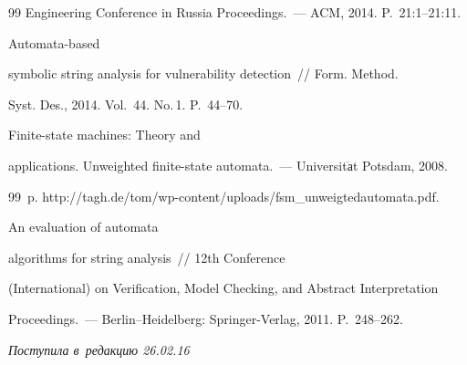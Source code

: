 {{\begin{thebibliography}{99}
Engineering Conference in Russia Proceedings.~--- ACM, 2014. P.~21:1--21:11.







 Automata-based 


symbolic string analysis for vulnerability detection~/\!\!/ Form. Method. 


Syst. Des., 2014. Vol.~44. No.\,1. P.~44--70.







 Finite-state machines: Theory and 


applications. Unweighted finite-state automata.~--- Universit$\ddot{\mbox{а}}$t Potsdam,  2008.


99~p. {\sf http://tagh.de/tom/wp-content/uploads/fsm\_unweigtedautomata.pdf}.










 An evaluation of automata 


algorithms for string analysis~/\!\!/ 12th Conference 


(International) on Verification, Model Checking, and Abstract Interpretation


Proceedings.~--- Berlin--Heidelberg: Springer-Verlag, 2011. P.~248--262.





     \end{thebibliography}


} }








\vspace*{-3pt}





\hfill{\small\textit{Поступила в~редакцию 26.02.16}}



















